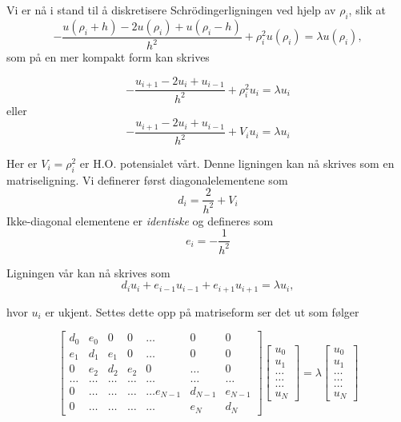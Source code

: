 \documentclass{article}
\begin{document}
Vi er nå i stand til å diskretisere Schrödingerligningen ved hjelp av $\rho_i$, slik at 
\[
-\frac{u(\rho_i+h) -2u(\rho_i) +u(\rho_i-h)}{h^2}+\rho_i^2u(\rho_i)  = \lambda u(\rho_i),
\]
som på en mer kompakt form kan skrives 

\[ -\frac{u_{i+1} -2u_i +u_{i-1}}{h^2}+\rho_i^2u_i= \lambda u_i \]
eller
\[-\frac{u_{i+1} -2u_i +u_{i-1} }{h^2}+V_iu_i  = \lambda u_i  \]

Her er $V_i = \rho_i^2$ er H.O. potensialet vårt. Denne ligningen kan nå skrives som en matriseligning. Vi definerer først diagonalelementene som 
\[ d_i = \frac{2}{h^2} + V_i \]
Ikke-diagonal elementene er \textit{identiske} og defineres som
\[e_i = -\frac{1}{h^2} \]

Ligningen vår kan nå skrives som 
\begin{equation}
d_iu_i+e_{i-1}u_{i-1}+e_{i+1}u_{i+1}  = \lambda u_i,
\end{equation}

hvor $u_i$ er ukjent. Settes dette opp på matriseform ser det ut som følger

\begin{equation}
    \begin{bmatrix}d_0 & e_0 & 0   & 0    & \dots  &0     & 0 \\
                                e_1 & d_1 & e_1 & 0    & \dots  &0     &0 \\
                                0   & e_2 & d_2 & e_2  &0       &\dots & 0\\
                                \dots  & \dots & \dots & \dots  &\dots      &\dots & \dots\\
                                0   & \dots & \dots & \dots  &\dots  e_{N-1}     &d_{N-1} & e_{N-1}\\
                                0   & \dots & \dots & \dots  &\dots       &e_{N} & d_{N}
             \end{bmatrix}  \begin{bmatrix} u_{0} \\
                                                              u_{1} \\
                                                              \dots\\ \dots\\ \dots\\
                                                              u_{N}
             \end{bmatrix}=\lambda \begin{bmatrix} u_{0} \\
                                                              u_{1} \\
                                                              \dots\\ \dots\\ \dots\\
                                                              u_{N}
             \end{bmatrix}
\end{equation} 
\end{document}
